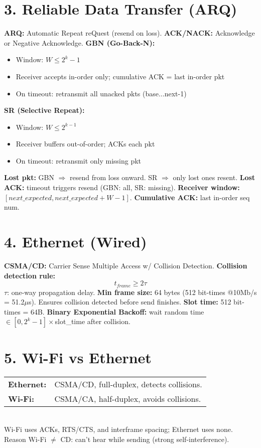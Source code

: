 \documentclass[10pt]{article}
\begin{document}
\begin{multicols*}{2}
\section*{3. Reliable Data Transfer (ARQ)}
\textbf{ARQ:} Automatic Repeat reQuest (resend on loss).  
\textbf{ACK/NACK:} Acknowledge or Negative Acknowledge.  
\textbf{GBN (Go-Back-N):}
\begin{itemize}\itemsep0pt
\item Window: $W \le 2^k - 1$
\item Receiver accepts in-order only; cumulative ACK = last in-order pkt
\item On timeout: retransmit all unacked pkts (base$\ldots$next-1)
\end{itemize}
\textbf{SR (Selective Repeat):}
\begin{itemize}\itemsep0pt
\item Window: $W \le 2^{k-1}$
\item Receiver buffers out-of-order; ACKs each pkt
\item On timeout: retransmit only missing pkt
\end{itemize}
\textbf{Lost pkt:}  
GBN $\Rightarrow$ resend from loss onward.  
SR $\Rightarrow$ only lost ones resent.  
\textbf{Lost ACK:} timeout triggers resend (GBN: all, SR: missing).  
\textbf{Receiver window:} $[next\_expected, next\_expected+W-1]$.  
\textbf{Cumulative ACK:} last in-order seq num.  

\section*{4. Ethernet (Wired)}
\textbf{CSMA/CD:} Carrier Sense Multiple Access w/ Collision Detection.  
\textbf{Collision detection rule:}
\[
t_{frame} \ge 2\tau
\]
$\tau$: one-way propagation delay.  
\textbf{Min frame size:} 64 bytes (512 bit-times @10Mb/s = 51.2$\mu$s).  
Ensures collision detected before send finishes.  
\textbf{Slot time:} 512 bit-times = 64B.  
\textbf{Binary Exponential Backoff:} wait random time $\in[0,2^k-1]\times$slot\_time after collision.

\section*{5. Wi-Fi vs Ethernet}
\begin{tabular}{p{1.1cm}p{2.9cm}}
\textbf{Ethernet:} & CSMA/CD, full-duplex, detects collisions.\\
\textbf{Wi-Fi:} & CSMA/CA, half-duplex, avoids collisions.\\
\end{tabular}\\[2pt]
Wi-Fi uses ACKs, RTS/CTS, and interframe spacing; Ethernet uses none.  
Reason Wi-Fi $\neq$ CD: can’t hear while sending (strong self-interference).


\end{multicols*}
\end{document}
